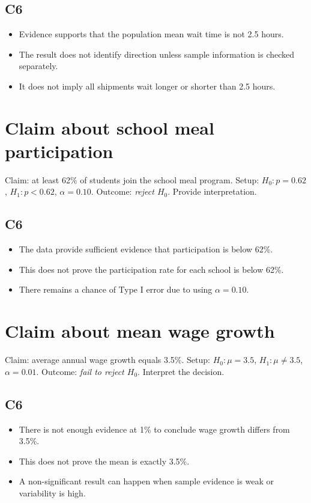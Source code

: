 \begin{ExamProblems}
\subsection*{C6}
\begin{itemize}
    \item Evidence supports that the population mean wait time is not 2.5 hours.
    \item The result does not identify direction unless sample information is checked separately.
    \item It does not imply all shipments wait longer or shorter than 2.5 hours.
\end{itemize}

\item
\section{Claim about school meal participation}
Claim: at least 62\% of students join the school meal program. Setup: \(H_0\colon p=0.62\), \(H_1\colon p<0.62\), \(\alpha=0.10\). Outcome: \textit{reject \(H_0\)}. Provide interpretation.

\subsection*{C6}
\begin{itemize}
    \item The data provide sufficient evidence that participation is below 62\%.
    \item This does not prove the participation rate for each school is below 62\%.
    \item There remains a chance of Type I error due to using \(\alpha=0.10\).
\end{itemize}

\item
\section{Claim about mean wage growth}
Claim: average annual wage growth equals 3.5\%. Setup: \(H_0\colon \mu=3.5\), \(H_1\colon \mu\ne 3.5\), \(\alpha=0.01\). Outcome: \textit{fail to reject \(H_0\)}. Interpret the decision.

\subsection*{C6}
\begin{itemize}
    \item There is not enough evidence at 1\% to conclude wage growth differs from 3.5\%.
    \item This does not prove the mean is exactly 3.5\%.
    \item A non-significant result can happen when sample evidence is weak or variability is high.
\end{itemize}


\end{ExamProblems}
